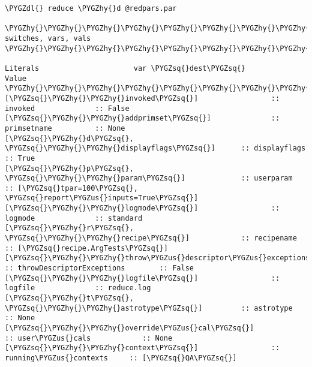 \documentclass[letterpaper,10pt,english]{sphinxmanual}
\def\PYGZus{\char`\_}
\def\PYGZdl{\char`\$}
\def\PYGZhy{\char`\-}
\def\PYGZsq{\char`\'}
\begin{document}
\begin{Verbatim}[commandchars=\\\{\}]
\PYGZdl{} reduce \PYGZhy{}d @redpars.par

\PYGZhy{}\PYGZhy{}\PYGZhy{}\PYGZhy{}\PYGZhy{}\PYGZhy{}\PYGZhy{}\PYGZhy{}\PYGZhy{}\PYGZhy{}\PYGZhy{}\PYGZhy{}\PYGZhy{}\PYGZhy{}\PYGZhy{}\PYGZhy{}\PYGZhy{}\PYGZhy{}\PYGZhy{}\PYGZhy{}   switches, vars, vals  \PYGZhy{}\PYGZhy{}\PYGZhy{}\PYGZhy{}\PYGZhy{}\PYGZhy{}\PYGZhy{}\PYGZhy{}\PYGZhy{}\PYGZhy{}\PYGZhy{}\PYGZhy{}\PYGZhy{}\PYGZhy{}\PYGZhy{}\PYGZhy{}\PYGZhy{}\PYGZhy{}\PYGZhy{}\PYGZhy{}

Literals                      var \PYGZsq{}dest\PYGZsq{}              Value
\PYGZhy{}\PYGZhy{}\PYGZhy{}\PYGZhy{}\PYGZhy{}\PYGZhy{}\PYGZhy{}\PYGZhy{}\PYGZhy{}\PYGZhy{}\PYGZhy{}\PYGZhy{}\PYGZhy{}\PYGZhy{}\PYGZhy{}\PYGZhy{}\PYGZhy{}\PYGZhy{}\PYGZhy{}\PYGZhy{}\PYGZhy{}\PYGZhy{}\PYGZhy{}\PYGZhy{}\PYGZhy{}\PYGZhy{}\PYGZhy{}\PYGZhy{}\PYGZhy{}\PYGZhy{}\PYGZhy{}\PYGZhy{}\PYGZhy{}\PYGZhy{}\PYGZhy{}\PYGZhy{}\PYGZhy{}\PYGZhy{}\PYGZhy{}\PYGZhy{}\PYGZhy{}\PYGZhy{}\PYGZhy{}\PYGZhy{}\PYGZhy{}\PYGZhy{}\PYGZhy{}\PYGZhy{}\PYGZhy{}\PYGZhy{}\PYGZhy{}\PYGZhy{}\PYGZhy{}\PYGZhy{}\PYGZhy{}\PYGZhy{}\PYGZhy{}\PYGZhy{}\PYGZhy{}\PYGZhy{}\PYGZhy{}\PYGZhy{}\PYGZhy{}\PYGZhy{}\PYGZhy{}
[\PYGZsq{}\PYGZhy{}\PYGZhy{}invoked\PYGZsq{}]                 :: invoked              :: False
[\PYGZsq{}\PYGZhy{}\PYGZhy{}addprimset\PYGZsq{}]              :: primsetname          :: None
[\PYGZsq{}\PYGZhy{}d\PYGZsq{}, \PYGZsq{}\PYGZhy{}\PYGZhy{}displayflags\PYGZsq{}]      :: displayflags         :: True
[\PYGZsq{}\PYGZhy{}p\PYGZsq{}, \PYGZsq{}\PYGZhy{}\PYGZhy{}param\PYGZsq{}]             :: userparam            :: [\PYGZsq{}tpar=100\PYGZsq{}, \PYGZsq{}report\PYGZus{}inputs=True\PYGZsq{}]
[\PYGZsq{}\PYGZhy{}\PYGZhy{}logmode\PYGZsq{}]                 :: logmode              :: standard
[\PYGZsq{}\PYGZhy{}r\PYGZsq{}, \PYGZsq{}\PYGZhy{}\PYGZhy{}recipe\PYGZsq{}]            :: recipename           :: [\PYGZsq{}recipe.ArgTests\PYGZsq{}]
[\PYGZsq{}\PYGZhy{}\PYGZhy{}throw\PYGZus{}descriptor\PYGZus{}exceptions\PYGZsq{}] :: throwDescriptorExceptions        :: False
[\PYGZsq{}\PYGZhy{}\PYGZhy{}logfile\PYGZsq{}]                 :: logfile              :: reduce.log
[\PYGZsq{}\PYGZhy{}t\PYGZsq{}, \PYGZsq{}\PYGZhy{}\PYGZhy{}astrotype\PYGZsq{}]         :: astrotype            :: None
[\PYGZsq{}\PYGZhy{}\PYGZhy{}override\PYGZus{}cal\PYGZsq{}]            :: user\PYGZus{}cals            :: None
[\PYGZsq{}\PYGZhy{}\PYGZhy{}context\PYGZsq{}]                 :: running\PYGZus{}contexts     :: [\PYGZsq{}QA\PYGZsq{}]

\end{Verbatim}
\end{document}
